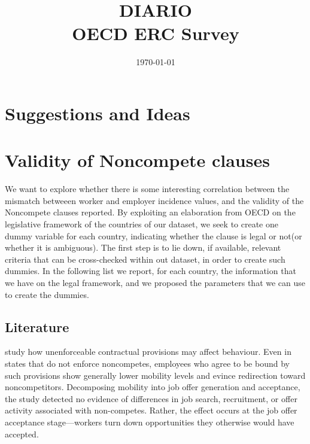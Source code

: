 \documentclass[11pt,a4paper]{article}
\title{DIARIO \\ OECD ERC Survey}
\author{}            %
\date{\today}        %
\begin{document}
\maketitle
\thispagestyle{empty}

\newpage





\newpage
\tableofcontents
\thispagestyle{empty}

\newpage
\setcounter{page}{1}
\section{Suggestions and Ideas}

\newpage



\section{Validity of Noncompete clauses}




We want to explore whether there is some interesting correlation between the mismatch betweeen worker and employer incidence values, and the validity of the Noncompete clauses reported. By exploiting an elaboration from OECD on the legislative framework of the countries of our dataset, we seek to create one dummy variable for each country, indicating whether the clause is legal or not(or whether it is ambiguous). The first step is to lie down, if available, relevant criteria that can be cross-checked within out dataset, in order to create such dummies. In the following list we report, for each country, the information that we have on the legal framework, and we proposed the parameters that we can use to create the dummies.

\subsection{Literature}

\cite{starr_behavioral_2020} study how unenforceable contractual provisions may affect behaviour. Even in states that
do not enforce noncompetes, employees who agree to be bound by such provisions show generally
lower mobility levels and evince redirection toward noncompetitors. Decomposing mobility into job offer generation and acceptance, the study detected no evidence of differences in job search, recruitment, or offer activity associated with non-competes. Rather, the effect occurs at the job offer acceptance stage—workers turn down opportunities they otherwise would have accepted.
\end{document}
